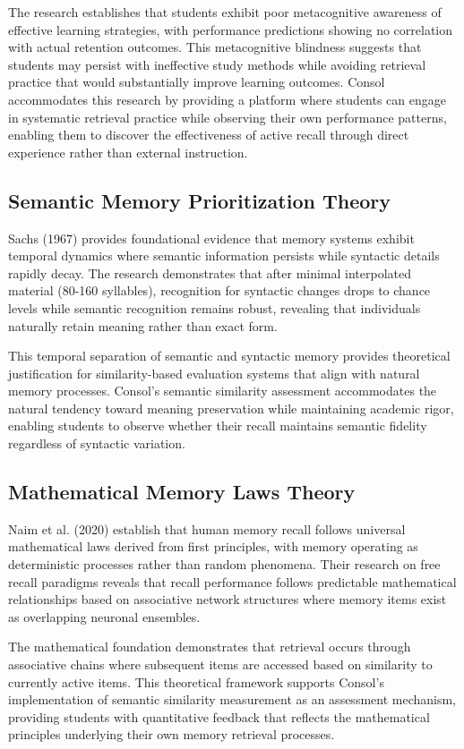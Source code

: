 {The research establishes that students exhibit poor metacognitive awareness of effective learning strategies, with performance predictions showing no correlation with actual retention outcomes. This metacognitive blindness suggests that students may persist with ineffective study methods while avoiding retrieval practice that would substantially improve learning outcomes. Consol accommodates this research by providing a platform where students can engage in systematic retrieval practice while observing their own performance patterns, enabling them to discover the effectiveness of active recall through direct experience rather than external instruction.

\subsection{Semantic Memory Prioritization Theory}

Sachs (1967) provides foundational evidence that memory systems exhibit temporal dynamics where semantic information persists while syntactic details rapidly decay. The research demonstrates that after minimal interpolated material (80-160 syllables), recognition for syntactic changes drops to chance levels while semantic recognition remains robust, revealing that individuals naturally retain meaning rather than exact form.

This temporal separation of semantic and syntactic memory provides theoretical justification for similarity-based evaluation systems that align with natural memory processes. Consol's semantic similarity assessment accommodates the natural tendency toward meaning preservation while maintaining academic rigor, enabling students to observe whether their recall maintains semantic fidelity regardless of syntactic variation.

\subsection{Mathematical Memory Laws Theory}

Naim et al. (2020) establish that human memory recall follows universal mathematical laws derived from first principles, with memory operating as deterministic processes rather than random phenomena. Their research on free recall paradigms reveals that recall performance follows predictable mathematical relationships based on associative network structures where memory items exist as overlapping neuronal ensembles.

The mathematical foundation demonstrates that retrieval occurs through associative chains where subsequent items are accessed based on similarity to currently active items. This theoretical framework supports Consol's implementation of semantic similarity measurement as an assessment mechanism, providing students with quantitative feedback that reflects the mathematical principles underlying their own memory retrieval processes.
}


